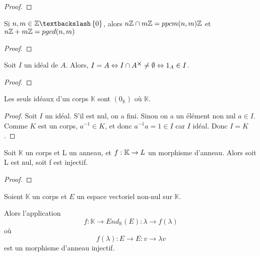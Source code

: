\ifdefined\outputproof
\begin{proof}

\end{proof}
\fi

\begin{proposition}
	Si $n, m \in \integer \textbackslash \GSset{0}$, alors $n\mathbb{Z} \cap
	m\mathbb{Z} = ppcm(n, m)\mathbb{Z}$ et $n\mathbb{Z} + m\mathbb{Z} = pgcd(n, m)$
\end{proposition}

\ifdefined\outputproof
\begin{proof}

\end{proof}
\fi

\begin{proposition}
	Soit $I$ un idéal de $A$. Alors, $I = A \Leftrightarrow I \cap A^{\cross} \neq
	\emptyset \Leftrightarrow 1_{A} \in I$.
\end{proposition}

\ifdefined\outputproof
\begin{proof}

\end{proof}
\fi

\begin{proposition}
	Les seuls idéaux d'un corps $\mathbb{K}$ sont $(0_{\mathbb{K}})$ où
	$\mathbb{K}$.
\end{proposition}

\ifdefined\outputproof
\begin{proof}
	Soit $I$ un idéal. S'il est nul, on a fini. Sinon on a un élément non
	nul $a \in I$. Comme $K$ est un corps, $a^{-1} \in K$, et donc $a^{-1}a = 1
	\in I$ car $I$ idéal. Donc $I = K$.
\end{proof}
\fi

\begin{corollary}
	Soit $\mathbb{K}$ un corps et L un anneau, et
	$f : \mathbb{K} \rightarrow L$ un morphisme d'anneau. Alors soit L est nul,
	soit f est injectif.
\end{corollary}

\ifdefined\outputproof
\begin{proof}

\end{proof}
\fi

\begin{exemple}
	Soient $\mathbb{K}$ un corps et $E$ un espace vectoriel non-nul sur
	$\mathbb{K}$.

	Alors l'application
	\begin{equation}
		f : \mathbb{K} \rightarrow End_{\mathbb{K}}(E) : \lambda \rightarrow
		f(\lambda)
	\end{equation}
	où
	\begin{equation}
		f(\lambda) : E \rightarrow E : v \rightarrow \lambda v
	\end{equation}
	est un morphisme d'anneau injectif.
\end{exemple}

